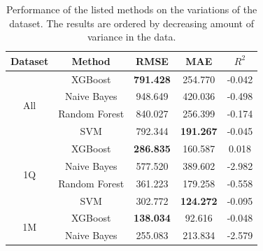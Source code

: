\documentclass[conference]{IEEEtran}
\begin{document}
\begin{table}[!t]
	
	\renewcommand{\arraystretch}{1.3}
	\label{model_performance}
	\centering
	\caption{Performance of the listed methods on the variations of the dataset. The results are ordered by decreasing amount of variance in the data.}
	\begin{tabular}{c|c|c|c|c}
		Dataset & Method & RMSE & MAE & $R^2$ \\
		\hline
		\multirow{4}{*}{All}
		&XGBoost& \textbf{791.428} & 254.770 & -0.042 \\
		&Naive Bayes& 948.649 & 420.036 & -0.498 \\
		&Random Forest& 840.027 & 256.399 & -0.174 \\
		& SVM & 792.344 & \textbf{191.267} & -0.045 \\
		\hline
		\multirow{4}{*}{1Q}
		&XGBoost& \textbf{286.835} & 160.587 & 0.018 \\
		&Naive Bayes& 577.520 & 389.602 & -2.982 \\
		&Random Forest& 361.223 & 179.258 & -0.558 \\
		& SVM & 302.772 & \textbf{124.272} & -0.095 \\
		\hline
		\multirow{4}{*}{1M}
		&XGBoost& \textbf{138.034} & 92.616 & -0.048 \\
		&Naive Bayes& 255.083 & 213.834 & -2.579 \\

\end{tabular}
\end{table}
\end{document}
